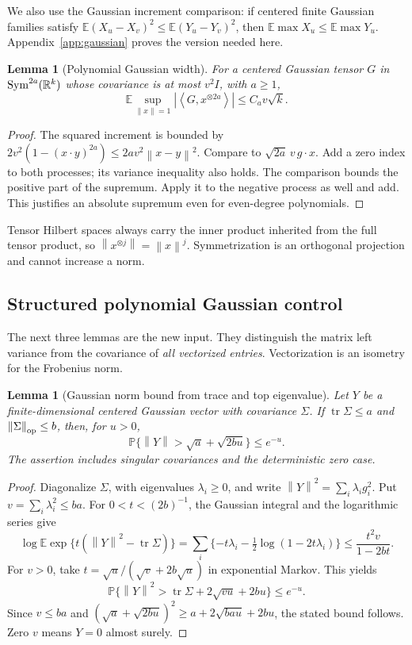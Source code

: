 \documentclass[11pt]{article}
\newtheorem{lemma}[theorem]{Lemma}
\theoremstyle{remark}\newtheorem{remark}[theorem]{Remark}
\newcommand{\R}{\mathbb R}\newcommand{\E}{\mathbb E}\newcommand{\Prob}{\mathbb P}
\newcommand{\tr}{\operatorname{tr}}\newcommand{\rank}{\operatorname{rank}}
\newcommand{\norm}[1]{\left\|#1\right\|}\newcommand{\ip}[2]{\left\langle #1,#2\right\rangle}
\begin{document}
We also use the Gaussian increment comparison: if centered finite Gaussian families satisfy $\E(X_u-X_v)^2\le\E(Y_u-Y_v)^2$, then $\E\max X_u\le\E\max Y_u$. Appendix~\ref{app:gaussian} proves the version needed here.
\begin{lemma}[Polynomial Gaussian width]\label{lem:width}
For a centered Gaussian tensor $G$ in $\Sym^{2a}(\R^k)$ whose covariance is at most $v^2I$, with $a\ge1$,
\[
 \E\sup_{\norm x=1}|\ip{G}{x^{\otimes2a}}|\le C_a v\sqrt{k}.
\]
\end{lemma}
\begin{proof}
The squared increment is bounded by $2v^2(1-(x\cdot y)^{2a})\le2av^2\norm{x-y}^2$. Compare to $\sqrt{2a}\,v\,g\cdot x$. Add a zero index to both processes; its variance inequality also holds. The comparison bounds the positive part of the supremum. Apply it to the negative process as well and add. This justifies an absolute supremum even for even-degree polynomials.
\end{proof}
Tensor Hilbert spaces always carry the inner product inherited from the full tensor product, so $\norm{x^{\otimes j}}=\norm x^j$. Symmetrization is an orthogonal projection and cannot increase a norm.

\subsection{Structured polynomial Gaussian control}\label{sub:structured}
The next three lemmas are the new input. They distinguish the matrix left variance from the covariance of \emph{all vectorized entries}. Vectorization is an isometry for the Frobenius norm.

\begin{lemma}[Gaussian norm bound from trace and top eigenvalue]\label{lem:gaussian-norm}
Let $Y$ be a finite-dimensional centered Gaussian vector with covariance $\Sigma$. If $\tr\Sigma\le a$ and $\norm\Sigma_{\op}\le b$, then, for $u>0$,
\[
 \Prob\{\norm Y>\sqrt a+\sqrt{2bu}\}\le e^{-u}.
\]
The assertion includes singular covariances and the deterministic zero case.
\end{lemma}
\begin{proof}
Diagonalize $\Sigma$, with eigenvalues $\lambda_i\ge0$, and write $\norm Y^2=\sum_i\lambda_i g_i^2$. Put $v=\sum_i\lambda_i^2\le ba$. For $0<t<(2b)^{-1}$, the Gaussian integral and the logarithmic series give
\[
 \log\E\exp\{t(\norm Y^2-\tr\Sigma)\}
 =\sum_i\{-t\lambda_i-\tfrac12\log(1-2t\lambda_i)\}
 \le\frac{t^2v}{1-2bt}.
\]
For $v>0$, take $t=\sqrt u/(\sqrt v+2b\sqrt u)$ in exponential Markov. This yields
\[
 \Prob\{\norm Y^2>\tr\Sigma+2\sqrt{vu}+2bu\}\le e^{-u}.
\]
Since $v\le ba$ and $(\sqrt a+\sqrt{2bu})^2\ge a+2\sqrt{bau}+2bu$, the stated bound follows. Zero $v$ means $Y=0$ almost surely.
\end{proof}
\end{document}
